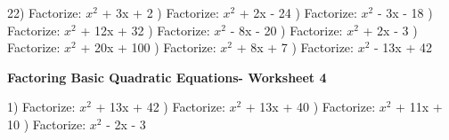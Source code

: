 \documentclass{article}%
\begin{document}
22) Factorize: $x^2$ + 3x + 2%
\newline%
\newline%
) Factorize: $x^2$ + 2x - 24%
\newline%
\newline%
) Factorize: $x^2$ - 3x - 18%
\newline%
\newline%
) Factorize: $x^2$ + 12x + 32%
\newline%
\newline%
) Factorize: $x^2$ - 8x - 20%
\newline%
\newline%
) Factorize: $x^2$ + 2x - 3%
\newline%
\newline%
) Factorize: $x^2$ + 20x + 100%
\newline%
\newline%
) Factorize: $x^2$ + 8x + 7%
\newline%
\newline%
) Factorize: $x^2$ - 13x + 42%
\newline%
\newline%
\newline%
\pagebreak%
\large%
\begin{center}%
\textbf{Factoring Basic Quadratic Equations- Worksheet 4}%
\newline%
\newline%
\newline%
\end{center} \normalsize%
1) Factorize: $x^2$ + 13x + 42%
\newline%
\newline%
) Factorize: $x^2$ + 13x + 40%
\newline%
\newline%
) Factorize: $x^2$ + 11x + 10%
\newline%
\newline%
) Factorize: $x^2$ - 2x - 3%
\newline%
\end{document}
